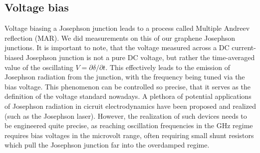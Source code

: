 \subsection{Voltage bias}
Voltage biasing a Josephson junction leads to a process called Multiple Andreev reflection (MAR).
We did measurements on this of our graphene Josephson junctions.
It is important to note, that the voltage measured across a DC current-biased Josephson junction is not a pure DC voltage, but rather the time-averaged value of the oscillating $V=\partial\delta/\partial t$.
This effectively leads to the emission of Josephson radiation from the junction, with the frequency being tuned via the bias voltage.
This phenomenon can be controlled so precise, that it serves as the definition of the voltage standard nowadays.
A plethora of potential applications of Josephson radiation in cicruit electrodynamics have been proposed and realized (such as the Josephson laser).
However, the realization of such devices needs to be engineered quite precise, as reaching oscillation frequencies in the GHz regime requires bias voltages in the microvolt range, often requiring small shunt resistors which pull the Josephson junction far into the overdamped regime.